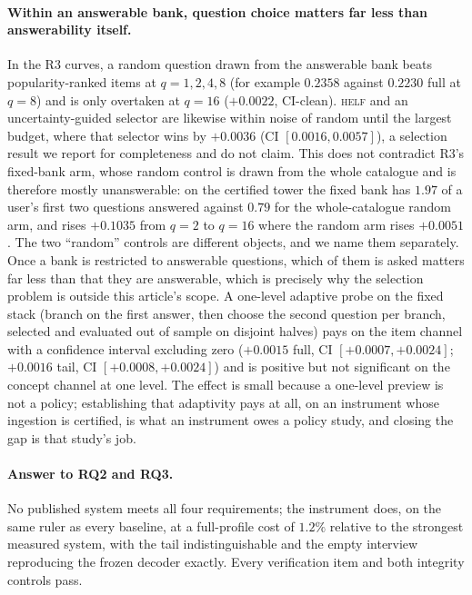 \documentclass[acmsmall,review,anonymous]{acmart}
\begin{document}
\paragraph{Within an answerable bank, question choice matters far less than answerability itself.} In the R3 curves, a random question drawn from the answerable bank beats popularity-ranked items at $q{=}1,2,4,8$ (for example $0.2358$ against $0.2230$ full at $q{=}8$) and is only overtaken at $q{=}16$ ($+0.0022$, CI-clean). \textsc{helf} and an uncertainty-guided selector are likewise within noise of random until the largest budget, where that selector wins by $+0.0036$ (CI $[0.0016,0.0057]$), a selection result we report for completeness and do not claim. This does not contradict R3's fixed-bank arm, whose random control is drawn from the whole catalogue and is therefore mostly unanswerable: on the certified tower the fixed bank has $1.97$ of a user's first two questions answered against $0.79$ for the whole-catalogue random arm, and rises $+0.1035$ from $q{=}2$ to $q{=}16$ where the random arm rises $+0.0051$. The two ``random'' controls are different objects, and we name them separately. Once a bank is restricted to answerable questions, which of them is asked matters far less than that they are answerable, which is precisely why the selection problem is outside this article's scope. A one-level adaptive probe on the fixed stack (branch on the first answer, then choose the second question per branch, selected and evaluated out of sample on disjoint halves) pays on the item channel with a confidence interval excluding zero ($+0.0015$ full, CI $[+0.0007,+0.0024]$; $+0.0016$ tail, CI $[+0.0008,+0.0024]$) and is positive but not significant on the concept channel at one level. The effect is small because a one-level preview is not a policy; establishing that adaptivity pays at all, on an instrument whose ingestion is certified, is what an instrument owes a policy study, and closing the gap is that study's job.

\paragraph{Answer to RQ2 and RQ3.} No published system meets all four requirements; the instrument does, on the same ruler as every baseline, at a full-profile cost of $1.2\%$ relative to the strongest measured system, with the tail indistinguishable and the empty interview reproducing the frozen decoder exactly. Every verification item and both integrity controls pass.
\end{document}
